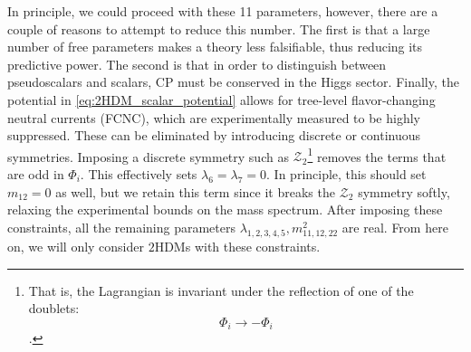 In principle, we could proceed with these 11 parameters, however, there are a couple of reasons to attempt to reduce this number. The first is that a large number of free parameters makes a theory less falsifiable, thus reducing its predictive power. The second is that in order to distinguish between pseudoscalars and scalars, CP must be conserved in the Higgs sector. Finally, the potential in \eqref{eq:2HDM_scalar_potential} allows for tree-level flavor-changing neutral currents (FCNC), which are experimentally measured to be highly suppressed. These can be eliminated by introducing discrete or continuous symmetries. Imposing a discrete symmetry such as $\mathcal{Z}_2$\footnote{That is, the Lagrangian is invariant under the reflection of one of the doublets: \[\Phi_i\rightarrow-\Phi_i\].} removes the terms that are odd in $\Phi_i$. This effectively sets $\lambda_6=\lambda_7 = 0$. In principle, this should set $m_{12} = 0$ as well, but we retain this term since it breaks the $\mathcal{Z}_2$ symmetry softly, relaxing the experimental bounds on the mass spectrum.
After imposing these constraints, all the remaining parameters $\lambda_{1,2,3,4,5}, m_{11,12,22}^2$ are real. From here on, we will only consider $2$HDMs with these constraints. 

